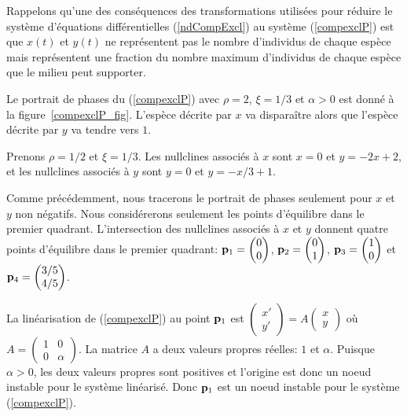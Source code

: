 {\begin{egg}
Rappelons qu'une des conséquences des transformations utilisées pour
réduire le système d'équations différentielles (\ref{ndCompExcl}) au
système (\ref{compexclP}) est que $x(t)$ et $y(t)$ ne représentent pas
le nombre d'individus de chaque espèce mais représentent une fraction
du nombre maximum d'individus de chaque espèce que le milieu peut
supporter.

Le portrait de phases du (\ref{compexclP}) avec $\rho=2$, $\xi = 1/3$
et $\alpha>0$ est donné à la figure~\ref{compexclP_fig}.  L'espèce 
décrite par $x$ va disparaître alors que l'espèce décrite par $y$ va
tendre vers $1$.


 Prenons $\rho=1/2$ et $\xi = 1/3$.  Les nullclines associés à $x$
sont $x=0$ et $y= -2x + 2$, et les nullclines associés à $y$ sont $y=0$ et
$y= -x/3 + 1$.

Comme précédemment, nous tracerons le portrait de phases seulement pour $x$
et $y$ non négatifs.  Nous considérerons seulement les points d'équilibre
dans le premier quadrant.  L'intersection des nullclines associés à $x$ et
$y$ donnent quatre points d'équilibre dans le premier quadrant:
$\displaystyle \mathbf{p}_1 = \begin{pmatrix} 0 \\ 0 \end{pmatrix}$,
$\displaystyle \mathbf{p}_2 = \begin{pmatrix} 0 \\ 1 \end{pmatrix}$,
$\displaystyle \mathbf{p}_3 = \begin{pmatrix} 1 \\ 0 \end{pmatrix}$
et
$\displaystyle \mathbf{p}_4 = \begin{pmatrix} 3/5 \\ 4/5 \end{pmatrix}$.

La linéarisation de (\ref{compexclP}) au point $\mathbf{p}_1$ est
$\begin{pmatrix} x' \\ y' \end{pmatrix} = A
\begin{pmatrix} x \\ y \end{pmatrix}$ où
$\displaystyle A = \begin{pmatrix} 1 & 0 \\ 0 & \alpha \end{pmatrix}$.
La matrice $A$ a deux valeurs propres réelles: $1$ et $\alpha$.  Puisque
$\alpha >0$, les deux valeurs propres sont positives et l'origine est
donc un noeud instable pour le système linéarisé.
Donc $\mathbf{p}_1$ est un noeud instable pour le système (\ref{compexclP}).


\end{egg}}
